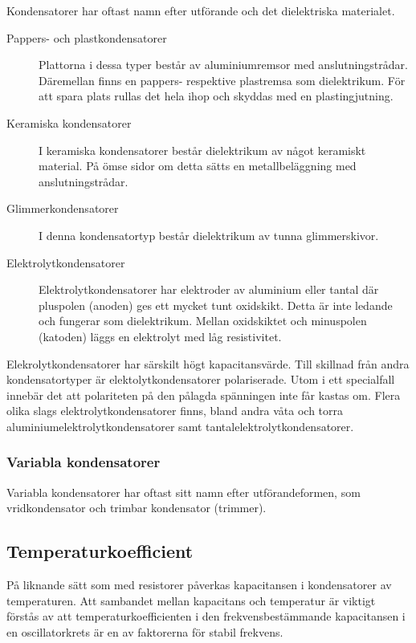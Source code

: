 Kondensatorer har oftast namn efter utförande och det dielektriska materialet.
\begin{description}
\item[Pappers- och plastkondensatorer]
Plattorna i dessa typer består av aluminiumremsor med anslutningstrådar.
Däremellan finns en pap\-pe\-rs- re\-spe\-k\-ti\-ve plastremsa som dielektrikum. För att
spara plats rullas det hela ihop och skyddas med en plastingjutning.

\item[Keramiska kondensatorer]
I keramiska kondensatorer består dielektrikum av något keramiskt material.
På ömse sidor om detta sätts en metallbeläggning med anslutningstrådar.

\item[Glimmerkondensatorer]
I denna kondensatortyp består dielektrikum av tunna glimmerskivor.

\item[Elektrolytkondensatorer]
Elektrolytkondensatorer har elektroder av aluminium eller tantal där pluspolen
(anoden) ges ett mycket tunt oxidskikt. Detta är inte ledande och fungerar som
dielektrikum. Mellan oxidskiktet och minuspolen (katoden) läggs en elektrolyt
med låg resistivitet.
\end{description}

\noindent
Elekrolytkondensatorer har särskilt högt kapacitansvärde. Till skillnad från
andra kondensatortyper är elektolytkondensatorer polariserade. Utom i ett
specialfall innebär det att polariteten på den pålagda spänningen inte får
kastas om. Flera olika slags elektrolytkondensatorer finns, bland andra våta
och torra aluminiumelektrolytkondensatorer samt tantalelektrolytkondensatorer.

\subsubsection{Variabla kondensatorer}
Variabla kondensatorer har oftast sitt namn efter utförandeformen, som
vridkondensator och trimbar kondensator (trimmer).

\subsection{Temperaturkoefficient}

På liknande sätt som med resistorer påverkas kapacitansen i kondensatorer av
temperaturen. Att sambandet mellan kapacitans och temperatur är viktigt förstås
av att temperaturkoefficienten i den frekvensbestämmande kapacitansen i en
oscillatorkrets är en av faktorerna för stabil frekvens.

